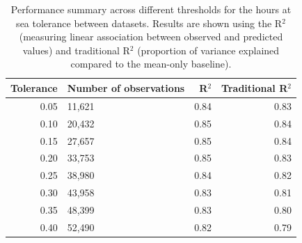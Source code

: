 \documentclass[lineno,pdflatex,sn-nature]{sn-jnl}
\providecommand{\DIFaddbegin}{} %
\providecommand{\DIFaddend}{} %
\providecommand{\DIFaddbeginFL}{} %
\providecommand{\DIFaddendFL}{} %
\providecommand{\DIFdelbeginFL}{} %
\providecommand{\DIFdelendFL}{} %
\providecommand{\DIFscaledelfig}{0.5}
\newlength{\DIFdelgraphicswidth} %
\newlength{\DIFdelgraphicsheight} %
\providecommand{\DIFaddincludegraphics}[2][]{{\color{blue}\fbox{\DIFOincludegraphics[#1]{#2}}}} %
\providecommand{\DIFdelincludegraphics}[2][]{%
\sbox{\DIFdelgraphicsbox}{\DIFOincludegraphics[#1]{#2}}%
\settoboxwidth{\DIFdelgraphicswidth}{\DIFdelgraphicsbox} %
\settoboxtotalheight{\DIFdelgraphicsheight}{\DIFdelgraphicsbox} %
\scalebox{\DIFscaledelfig}{%
\parbox[b]{\DIFdelgraphicswidth}{\usebox{\DIFdelgraphicsbox}\\[-\baselineskip] \rule{\DIFdelgraphicswidth}{0em}}\llap{\resizebox{\DIFdelgraphicswidth}{\DIFdelgraphicsheight}{%
\setlength{\unitlength}{\DIFdelgraphicswidth}%
\begin{picture}(1,1)%
\thicklines\linethickness{2pt} %
{\color[rgb]{1,0,0}\put(0,0){\framebox(1,1){}}}%
{\color[rgb]{1,0,0}\put(0,0){\line( 1,1){1}}}%
{\color[rgb]{1,0,0}\put(0,1){\line(1,-1){1}}}%
\end{picture}%
}\hspace*{3pt}}} %
} %
\DeclareRobustCommand{\DIFaddbegin}{\DIFOaddbegin \let\includegraphics\DIFaddincludegraphics} %
\DeclareRobustCommand{\DIFaddend}{\DIFOaddend \let\includegraphics\DIFOincludegraphics} %
\DeclareRobustCommand{\DIFaddbeginFL}{\DIFOaddbeginFL \let\includegraphics\DIFaddincludegraphics} %
\DeclareRobustCommand{\DIFaddendFL}{\DIFOaddendFL \let\includegraphics\DIFOincludegraphics} %
\DeclareRobustCommand{\DIFdelbeginFL}{\DIFOdelbeginFL \let\includegraphics\DIFdelincludegraphics} %
\DeclareRobustCommand{\DIFdelendFL}{\DIFOaddendFL \let\includegraphics\DIFOincludegraphics} %
\begin{document}
\begin{table}[!h]
\centering
\caption{\label{tab:tab-performance-tolerance-table}Performance summary across different thresholds for the hours at sea tolerance between datasets. Results are shown using the R$^{2}$ (measuring linear association between observed and predicted values) and traditional R$^{2}$ (proportion of variance explained compared to the mean-only baseline).}
\centering
\fontsize{8}{10}\selectfont
\DIFdelbeginFL %
\DIFdelendFL \DIFaddbeginFL \begin{tabular}[t]{r|l|r|r}
\hline
Tolerance & Number of observations & R$^{2}$ & Traditional R$^{2}$\\
\hline
0.05 & 11,621 & 0.84 & 0.83\\
\hline
0.10 & 20,432 & 0.85 & 0.84\\
\hline
0.15 & 27,657 & 0.85 & 0.84\\
\hline
0.20 & 33,753 & 0.85 & 0.83\\
\hline
0.25 & 38,980 & 0.84 & 0.82\\
\hline
0.30 & 43,958 & 0.83 & 0.81\\
\hline
0.35 & 48,399 & 0.83 & 0.80\\
\hline
0.40 & 52,490 & 0.82 & 0.79\\
\hline
\end{tabular}
\DIFaddendFL \end{table}
\DIFaddbegin \FloatBarrier
\DIFaddend 
\end{document}

